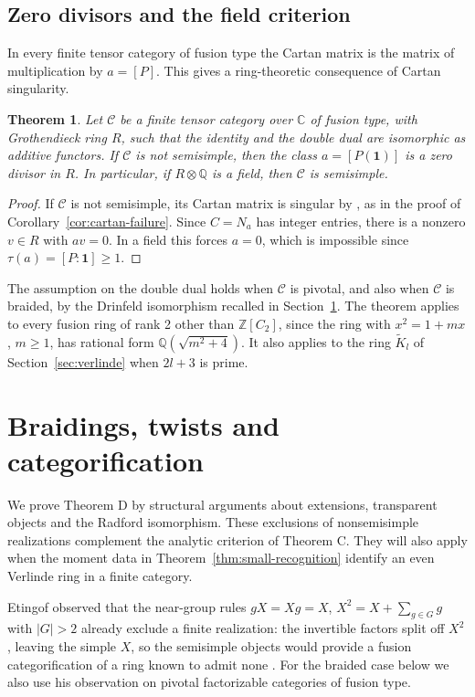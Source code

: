 \documentclass[11pt,reqno]{amsart}
\newtheorem{theorem}{Theorem}[section]
\theoremstyle{definition}
\newcommand{\one}{\mathbf 1}
\newcommand{\C}{\mathcal C}
\newcommand{\CC}{\mathbb C}
\newcommand{\ZZ}{\mathbb Z}
\begin{document}
\subsection{Zero divisors and the field criterion}
In every finite tensor category of fusion type the Cartan matrix is the matrix of multiplication by $a=[P]$. This gives a ring-theoretic consequence of Cartan singularity.

\begin{theorem}\label{thm:field}
Let $\C$ be a finite tensor category over $\CC$ of fusion type, with Grothendieck ring $R$, such that the identity and the double dual are isomorphic as additive functors. If $\C$ is not semisimple, then the class $a=[P(\one)]$ is a zero divisor in $R$. In particular, if $R\otimes\mathbb Q$ is a field, then $\C$ is semisimple.
\end{theorem}

\begin{proof}
If $\C$ is not semisimple, its Cartan matrix is singular by \cite[Theorem~6.6.1]{EGNO}, as in the proof of Corollary~\ref{cor:cartan-failure}. Since $C=N_a$ has integer entries, there is a nonzero $v\in R$ with $av=0$. In a field this forces $a=0$, which is impossible since $\tau(a)=[P:\one]\geq1$.
\end{proof}

The assumption on the double dual holds when $\C$ is pivotal, and also when $\C$ is braided, by the Drinfeld isomorphism recalled in Section~\ref{sec:categorification}. The theorem applies to every fusion ring of rank 2 other than $\ZZ[C_2]$, since the ring with $x^2=1+mx$, $m\geq1$, has rational form $\mathbb Q(\sqrt{m^2+4})$. It also applies to the ring $\widetilde K_l$ of Section~\ref{sec:verlinde} when $2l+3$ is prime.

\section{Braidings, twists and categorification}\label{sec:categorification}

We prove Theorem D by structural arguments about extensions, transparent objects and the Radford isomorphism. These exclusions of nonsemisimple realizations complement the analytic criterion of Theorem C. They will also apply when the moment data in Theorem~\ref{thm:small-recognition} identify an even Verlinde ring in a finite category.

Etingof observed that the near-group rules $gX=Xg=X$, $X^2=X+\sum_{g\in G}g$ with $|G|>2$ already exclude a finite realization: the invertible factors split off $X^2$, leaving the simple $X$, so the semisimple objects would provide a fusion categorification of a ring known to admit none \cite{MOEtingof}. For the braided case below we also use his observation on pivotal factorizable categories of fusion type.
\end{document}
